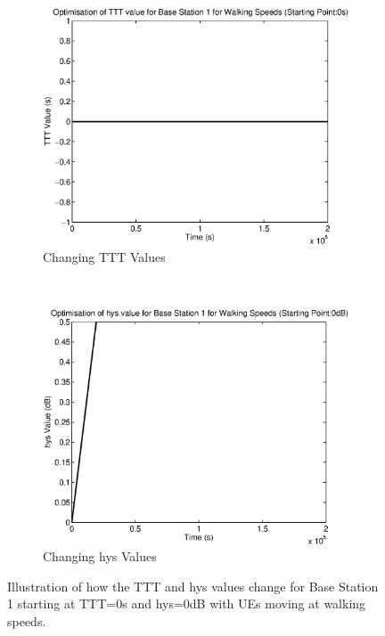 \begin{figure}[H]
        \centering
        \begin{subfigure}[b]{0.49\textwidth}
                \includegraphics[width=\textwidth]{figures/graphs/walklow/TTT1.eps}
                \caption{Changing TTT Values}
        \end{subfigure}%
        ~ %
        \begin{subfigure}[b]{0.49\textwidth}
                \includegraphics[width=\textwidth]{figures/graphs/walklow/hys1.eps}
                \caption{Changing hys Values}
        \end{subfigure}
        \caption{Illustration of how the TTT and hys values change for Base Station 1 starting at TTT=0s and hys=0dB with UEs moving at walking speeds.}
\end{figure}
